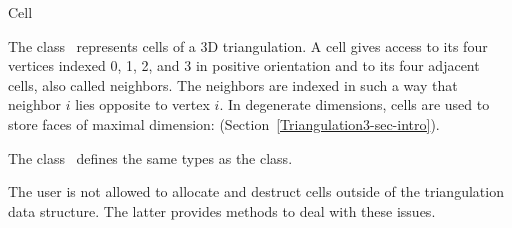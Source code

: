 

\begin{ccRefClass}{Cell}  %


\ccDefinition
  
The class \ccRefName\ represents cells of a 3D triangulation. 
A cell gives access to its four vertices indexed 0,
1, 2, and 3 in positive orientation and to its four adjacent cells, also
called neighbors. The neighbors are indexed in such a way that neighbor
$i$ lies opposite to vertex $i$.
In degenerate dimensions, cells are used to store faces of maximal
dimension: (Section~\ref{Triangulation3-sec-intro}).


\ccInheritsFrom
{}

\ccTypes

The class \ccRefName\ defines the same types as the
 class.

\begin{ccAdvanced}
\ccCreation

The user is not allowed to allocate and destruct cells outside of the
triangulation data structure.  The latter provides methods to deal with these
issues.




\end{ccAdvanced}
\end{ccRefClass}
